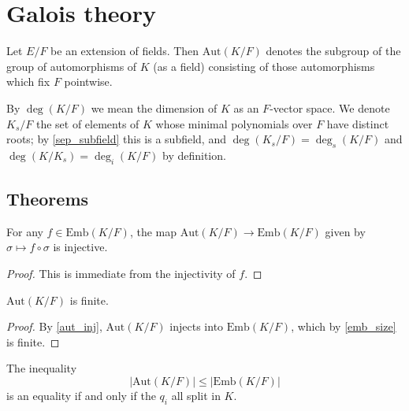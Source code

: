 \section{Galois theory}
\label{section-galois}


\begin{definition}
\label{definition-automorphisms}
Let $E/F$ be an extension of fields. Then $\text{Aut}(K/F)$ denotes the
subgroup of the group of automorphisms of $K$ (as a field) consisting of
those automorphisms which fix $F$ pointwise.
\end{definition}

\begin{definition}
By $\deg(K/F)$ we mean the dimension of $K$ as an $F$-vector
space. We denote $K_s/F$ the set of elements of $K$ whose minimal polynomials
over $F$ have distinct roots; by \ref{sep_subfield} this is a subfield, and
$\deg(K_s/F) = \deg_s(K/F)$ and $\deg(K/K_s) = \deg_i(K/F)$ by definition.
\label{def:sep}
\end{definition}

\subsection{Theorems}



\begin{lemma} For any $f \in \text{Emb}(K/F)$, the map $\text{Aut}(K/F) \to \text{Emb}(K/F)$ given
by $\sigma \mapsto f \circ \sigma$ is injective.
\label{aut_inj}
\end{lemma}

\begin{proof} This is immediate from the injectivity of $f$. \end{proof}

\begin{lemma} $\text{Aut}(K/F)$ is finite.
\label{aut_fin}
\end{lemma}

\begin{proof} By \ref{aut_inj}, $\text{Aut}(K/F)$ injects into $\text{Emb}(K/F)$, which by
\ref{emb_size} is finite. \end{proof}

\begin{proposition} The inequality
\begin{equation*}
|\text{Aut}(K/F)| \leq |\text{Emb}(K/F)|
\end{equation*}
is an equality if and only if the $q_i$ all split in $K$.
\label{aut_ineq}
\end{proposition}


